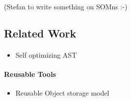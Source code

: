 (Stefan to write something on SOMns :-)



% 


\subsection{Related Work}


\paragraph{\vmframeworks{}} 

\begin{itemize}
\item  \cite{Wurthinger2012} Self optimizing AST
\end{itemize}

\paragraph{Reusable Tools} 

\begin{itemize}
\item \cite{WoB2014} Reusable Object storage model
\end{itemize}
